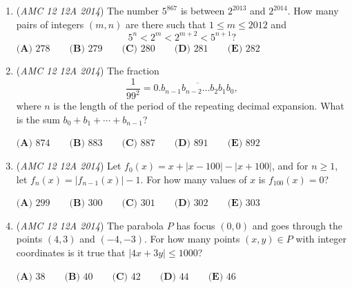 \begin{enumerate}
	\item (\textit{AMC 12 12A 2014}) The number $5^{867}$ is between $2^{2013}$ and $2^{2014}$.  How many pairs of integers $(m,n)$ are there such that $1\leq m\leq 2012$ and 
 \[5^n<2^m<2^{m+2}<5^{n+1}?\]
$\textbf{(A) }278\qquad \textbf{(B) }279\qquad \textbf{(C) }280\qquad \textbf{(D) }281\qquad \textbf{(E) }282\qquad$


	\item (\textit{AMC 12 12A 2014}) The fraction 
 \[\dfrac1{99^2}=0.\overline{b_{n-1}b_{n-2}\ldots b_2b_1b_0},\] where $n$ is the length of the period of the repeating decimal expansion.  What is the sum $b_0+b_1+\cdots+b_{n-1}$?


 $\textbf{(A) }874\qquad \textbf{(B) }883\qquad \textbf{(C) }887\qquad \textbf{(D) }891\qquad \textbf{(E) }892\qquad$


	\item (\textit{AMC 12 12A 2014}) Let $f_0(x)=x+|x-100|-|x+100|$, and for $n\geq 1$, let $f_n(x)=|f_{n-1}(x)|-1$.  For how many values of $x$ is $f_{100}(x)=0$?


 $\textbf{(A) }299\qquad \textbf{(B) }300\qquad \textbf{(C) }301\qquad \textbf{(D) }302\qquad \textbf{(E) }303\qquad$


	\item (\textit{AMC 12 12A 2014}) The parabola $P$ has focus $(0,0)$ and goes through the points $(4,3)$ and $(-4,-3)$.  For how many points $(x,y)\in P$ with integer coordinates is it true that $|4x+3y|\leq 1000$?


 $\textbf{(A) }38\qquad \textbf{(B) }40\qquad \textbf{(C) }42\qquad \textbf{(D) }44\qquad \textbf{(E) }46\qquad$


\end{enumerate}